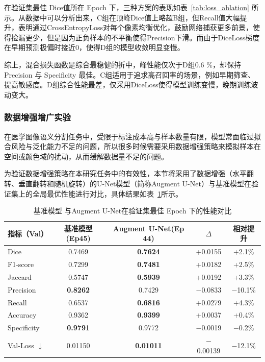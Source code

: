 在验证集最佳 Dice值所在 Epoch 下，三种方案的表现如表~\ref{tab:loss_ablation} 所示。从数据中可以分析出来，C组在顶峰Dice值上略超B组，但Recall值大幅提升，表明通过CrossEntropyLoss对每个像素均衡优化，鼓励网络捕获更多前景，使得捡漏更少，但是因为正负样本的不平衡使得Precision下滑。而由于DiceLoss梯度在早期预测极偏时接近0，使得D组的模型收敛明显变慢。

综上，混合损失函数是综合最稳健的折中，峰性能仅次于D组0.6 \%，却保持 Precision 与 Specificity 最佳。C组适用于追求高召回率的场景，例如早期筛查、提高敏感度。D组综合性能最差，仅采用DiceLoss使得模型训练变慢，晚期训练波动变大。

\subsubsection{数据增强增广实验}

在医学图像语义分割任务中，受限于标注成本高与样本数量有限，模型常面临过拟合风险与泛化能力不足的问题，所以很多时候需要采用数据增强策略来模拟样本在空间或颜色域的扰动，从而缓解数据量不足的问题。

为验证数据增强策略在本研究任务中的有效性，本节将采用了数据增强（水平翻转、垂直翻转和随机旋转）的U-Net模型（简称Augment U-Net）与基准模型在验证集上的全局最优性能进行对比，具体结果如表~\ref{tab:augment_best}所示。

\begin{table}[htbp]
    \centering
    \caption{基准模型 与Augment U-Net在验证集最佳 Epoch 下的性能对比}
    \label{tab:augment_best}
    \begin{tabular}{lcccc}
        \toprule
        指标（Val） & 基准模型(Ep45) & Augment U-Net(Ep 44) & $\Delta$ & 相对提升 \\
        \midrule
        Dice        & 0.7469 & \textbf{0.7624} & +0.0155 & +2.1\% \\
        F1-score    & 0.7299 & \textbf{0.7481} & +0.0182 & +2.5\% \\
        Jaccard     & 0.5747 & \textbf{0.5939} & +0.0192 & +3.3\% \\
        Precision   & \textbf{0.8262} & 0.7429 & $-$0.0833 & $-$10.1\% \\
        Recall      & 0.6537 & \textbf{0.6816} & +0.0279 & +4.3\% \\
        Accuracy    & 0.9362 & \textbf{0.9399} & +0.0037 & +0.4\% \\
        Specificity & \textbf{0.9791} & 0.9772 & $-$0.0019 & $-$0.2\% \\
        Val-Loss $\downarrow$ & 0.01150 & \textbf{0.01011} & $-$0.00139 & $-$12.1\% \\
        \bottomrule
    \end{tabular}
\end{table}

